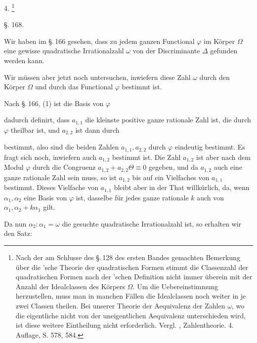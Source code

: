 
4. \footnote{Nach der am Schlusse des \S.\,128 des ersten Bandes gemachten Bemerkung über die 'sche Theorie der quadratischen Formen stimmt die Classenzahl der quadratischen Formen nach der 'schen Definition nicht immer überein mit der Anzahl der Idealclassen des Körpers $\Omega$. Um die Uebereinstimmung herzustellen, muss man in manchen Fällen die Idealclassen noch weiter in je zwei Classen theilen. Bei unserer Theorie der Aequivalenz der Zahlen $\omega$, wo die eigentliche nicht von der uneigentlichen Aequivalenz unterschieden wird, ist diese weitere Eintheilung nicht erforderlich. Vergl. , Zahlentheorie. 4. Auflage, S. 578, 584.}

\begin{center}
§. 168.

\end{center}

Wir haben im \S.\,166 gesehen, dass zu jedem ganzen Functional $\varphi$ im Körper $\Omega$ eine gewisse quadratische Irrationalzahl $\omega$ von der Discriminante $\varDelta$ gefunden werden kann.

Wir müssen aber jetzt noch untersuchen, inwiefern diese Zahl $\omega$ durch den Körper $\Omega$ und durch das Functional $\varphi$ bestimmt ist.

Nach \S.\,166, (1) ist die Basis von $\varphi$


dadurch definirt, dass $a_{1,1}$ die kleinste positive ganze rationale Zahl ist, die durch $\varphi$ theilbar ist, und $a_{2,2}$ ist dann durch


bestimmt, also sind die beiden Zahlen $a_{1,1},a_{2,2}$ durch $\varphi$ eindeutig bestimmt. Es fragt sich noch, inwiefern auch $a_{1,2}$ bestimmt ist. Die Zahl $a_{1,2}$ ist aber nach dem Modul $\varphi$ durch die Congruenz $a_{1,2}+a_{2,2}\Theta\equiv 0$ gegeben, und da $a_{1,2}$ auch eine ganze rationale Zahl sein muss, so ist $a_{1,2}$ bis auf ein Vielfaches von $a_{1,1}$ bestimmt. Dieses Vielfache von $a_{1,1}$ bleibt aber in der That willkürlich, da, wenn $\alpha_1,\alpha_2$ eine Basis von $\varphi$ ist, dasselbe für jedes ganze rationale $k$ auch von $\alpha_1,\alpha_2+k\alpha_1$ gilt.

Da nun $\alpha_2:\alpha_1=\omega$ die gesuchte quadratische Irrationalzahl ist, so erhalten wir den Satz:
